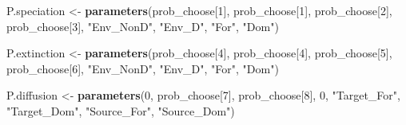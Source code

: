 \documentclass[]{book}
\newenvironment{Shaded}{\begin{snugshade}}{\end{snugshade}}
\newcommand{\KeywordTok}[1]{\textcolor[rgb]{0.13,0.29,0.53}{\textbf{{#1}}}}
\newcommand{\DecValTok}[1]{\textcolor[rgb]{0.00,0.00,0.81}{{#1}}}
\newcommand{\StringTok}[1]{\textcolor[rgb]{0.31,0.60,0.02}{{#1}}}
\newcommand{\NormalTok}[1]{{#1}}
\theoremstyle{definition}
\theoremstyle{definition}
\theoremstyle{definition}
\theoremstyle{remark}
\begin{document}
\begin{Shaded}
\begin{Highlighting}[]
    
\NormalTok{    P.speciation <-}\StringTok{ }\KeywordTok{parameters}\NormalTok{(prob_choose[}\DecValTok{1}\NormalTok{], prob_choose[}\DecValTok{1}\NormalTok{],}
\NormalTok{                               prob_choose[}\DecValTok{2}\NormalTok{], prob_choose[}\DecValTok{3}\NormalTok{],}
                               \StringTok{"Env_NonD"}\NormalTok{, }\StringTok{"Env_D"}\NormalTok{, }\StringTok{"For"}\NormalTok{, }\StringTok{"Dom"}\NormalTok{)}

\NormalTok{    P.extinction  <-}\StringTok{ }\KeywordTok{parameters}\NormalTok{(prob_choose[}\DecValTok{4}\NormalTok{], prob_choose[}\DecValTok{4}\NormalTok{],}
\NormalTok{                                prob_choose[}\DecValTok{5}\NormalTok{], prob_choose[}\DecValTok{6}\NormalTok{],}
                                \StringTok{"Env_NonD"}\NormalTok{, }\StringTok{"Env_D"}\NormalTok{, }\StringTok{"For"}\NormalTok{, }\StringTok{"Dom"}\NormalTok{)}

    
\NormalTok{    P.diffusion <-}\StringTok{ }\KeywordTok{parameters}\NormalTok{(}\DecValTok{0}\NormalTok{, prob_choose[}\DecValTok{7}\NormalTok{],}
\NormalTok{                              prob_choose[}\DecValTok{8}\NormalTok{], }\DecValTok{0}\NormalTok{,}
                              \StringTok{"Target_For"}\NormalTok{, }\StringTok{"Target_Dom"}\NormalTok{,}
                              \StringTok{"Source_For"}\NormalTok{, }\StringTok{"Source_Dom"}\NormalTok{)}
    

\end{Highlighting}
\end{Shaded}
\end{document}
